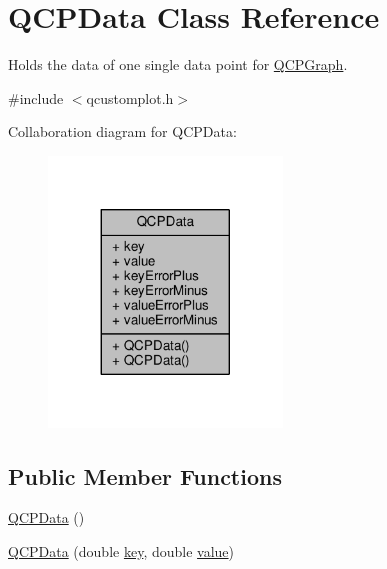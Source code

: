\hypertarget{class_q_c_p_data}{}\section{Q\+C\+P\+Data Class Reference}
\label{class_q_c_p_data}


Holds the data of one single data point for \hyperlink{class_q_c_p_graph}{Q\+C\+P\+Graph}.  




{\ttfamily \#include $<$qcustomplot.\+h$>$}



Collaboration diagram for Q\+C\+P\+Data\+:\nopagebreak
\begin{figure}[H]
\begin{center}
\leavevmode
\includegraphics[width=176pt]{class_q_c_p_data__coll__graph}
\end{center}
\end{figure}
\subsection*{Public Member Functions}
\begin{DoxyCompactItemize}
\item 
\hyperlink{class_q_c_p_data_a1f06d624e36ba0ed72ac36d42aa5c7ee}{Q\+C\+P\+Data} ()
\item 
\hyperlink{class_q_c_p_data_aa274181ae8de2a0907ba5464d3c2c103}{Q\+C\+P\+Data} (double \hyperlink{class_q_c_p_data_a2f5ba9aca61bb74f88516e148a4cf71b}{key}, double \hyperlink{class_q_c_p_data_aefe1ecf8fa2e34ed875b67523e542373}{value})
\end{DoxyCompactItemize}
